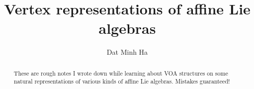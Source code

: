 

\setcounter{section}{-1}


\newcommand{\simpleroots}{\mathbb{I}}



    \title{Vertex representations of affine Lie algebras}
    
    \author{Dat Minh Ha}
    \maketitle
    
    \begin{abstract}
        These are rough notes I wrote down while learning about VOA structures on some natural representations of various kinds of affine Lie algebras. Mistakes guaranteed!
    \end{abstract}
    
    {
    \hypersetup{} 
    \tableofcontents %
    }

    

    

    

    

    
    
    \printbibliography

